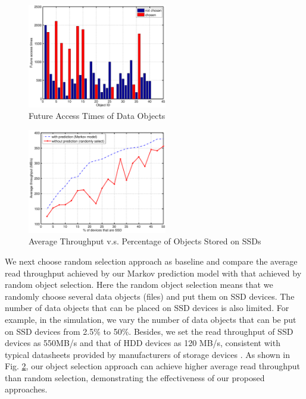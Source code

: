 \begin{figure}[!t]
\centering
\includegraphics[width=2.4in]{./prediction.pdf}
\caption{Future Access Times of Data Objects}
\vspace{-0.1in}
\label{prediction}
\end{figure}

\begin{figure}[!t]
\centering
\includegraphics[width=2.4in]{./throughput.pdf}
\caption{Average Throughput v.s. Percentage of Objects Stored on SSDs}
\vspace{-0.25in}
\label{throughput}
\end{figure}

We next choose random selection approach as baseline and compare the average read throughput achieved by our Markov prediction model with that achieved by random object selection. Here the random object selection means that we randomly choose several data objects (files) and put them on SSD devices. The number of data objects that can be placed on SSD devices is also limited. For example, in the simulation, we vary the number of data objects that can be put on SSD devices from 2.5\% to 50\%. Besides, we set the read throughput of SSD devices as 550MB/s and that of HDD devices as 120 MB/s, consistent with typical datasheets provided by manufacturers of storage devices \cite{chen2009understanding}. As shown in Fig. \ref{throughput}, our object selection approach can achieve higher average read throughput than random selection, demonstrating the effectiveness of our proposed approaches.


